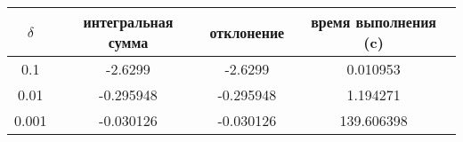 \begin{tabular}{|c|c|c|c|}
    \hline
    $\delta$ & интегральная сумма & отклонение & время выполнения (c)\\
    \hline
    0.1 & -2.6299 & -2.6299 & 0.010953\\
    \hline
    0.01 & -0.295948 & -0.295948 & 1.194271\\
    \hline
    0.001 & -0.030126 & -0.030126 & 139.606398\\
    \hline
\end{tabular}
